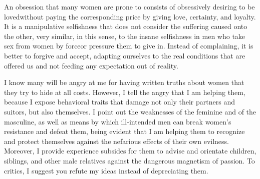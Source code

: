 
\par An obsession that many women are prone to consists of obsessively desiring to be loved\footnotemark[4] without paying the corresponding price by giving love, certainty, and loyalty. It is a manipulative selfishness that does not consider the suffering caused onto the other, very similar, in this sense, to the insane selfishness in men who take sex from women by force\footnotemark[5] or pressure them to give in. Instead of complaining, it is better to forgive and accept, adapting ourselves to the real conditions that are offered us and not feeding any expectation out of reality.



\par I know many will be angry at me for having written truths about women that they try to hide at all costs. However, I tell the angry that I am helping them, because I expose behavioral traits that damage not only their partners and suitors, but also themselves. I point out the weaknesses of the feminine and of the masculine, as well as means by which ill-intended men can break women's resistance and defeat them, being evident that I am helping them to recognize and protect themselves against the nefarious effects of their own evilness. Moreover, I provide experience subsides for them to advise and orientate children, siblings, and other male relatives against the dangerous magnetism of passion. To critics, I suggest you refute my ideas instead of depreciating them.

